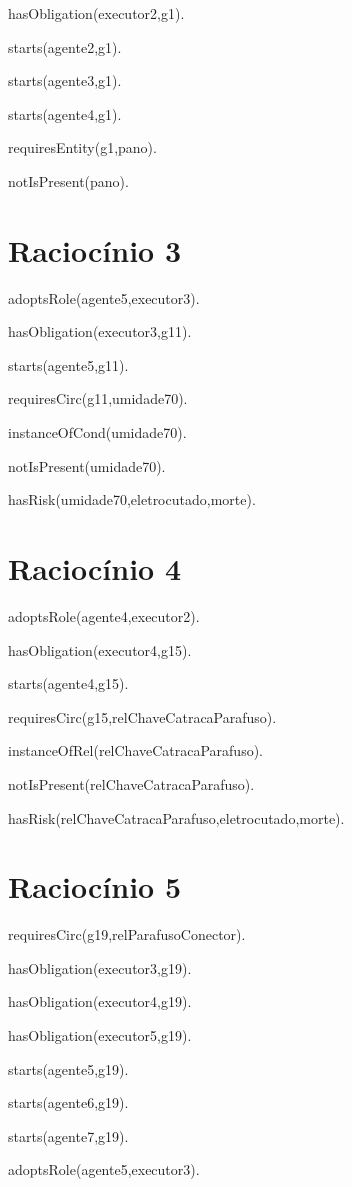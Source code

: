hasObligation(executor2,g1).

starts(agente2,g1). 

starts(agente3,g1).	 	

starts(agente4,g1).

requiresEntity(g1,pano).		

notIsPresent(pano).

\section{Raciocínio 3}


adoptsRole(agente5,executor3).

hasObligation(executor3,g11).	

starts(agente5,g11).

requiresCirc(g11,umidade70).

instanceOfCond(umidade70).

notIsPresent(umidade70).

hasRisk(umidade70,eletrocutado,morte).

\section{Raciocínio 4}

adoptsRole(agente4,executor2).

hasObligation(executor4,g15).	

starts(agente4,g15).

requiresCirc(g15,relChaveCatracaParafuso).

instanceOfRel(relChaveCatracaParafuso).	

notIsPresent(relChaveCatracaParafuso).

hasRisk(relChaveCatracaParafuso,eletrocutado,morte).

\section{Raciocínio 5}

requiresCirc(g19,relParafusoConector).

hasObligation(executor3,g19).

hasObligation(executor4,g19).

hasObligation(executor5,g19).

starts(agente5,g19).

starts(agente6,g19).

starts(agente7,g19).

adoptsRole(agente5,executor3).

